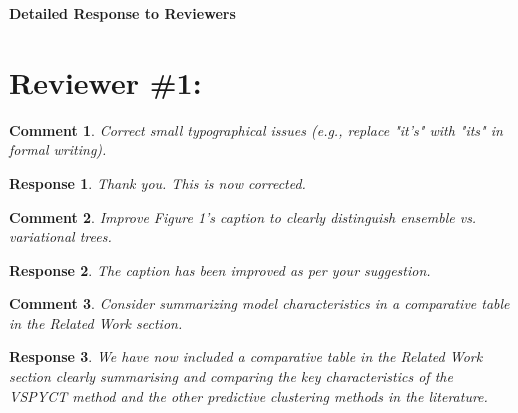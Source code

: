\documentclass [a4paper,11pt]{article}
\theoremstyle{blue}
\newtheorem{question}{Comment}[section]
\theoremstyle{blue}
\theoremstyle{note}
\newtheorem{answer}{Response}[section]
\theoremstyle{note}
\begin{document}
	
	\textbf{Detailed Response to Reviewers}\\[10pt]
	
	
	
	\section{Reviewer \#1:}


\begin{question}
Correct small typographical issues (e.g., replace "it's" with "its" in formal writing).
\end{question}

\begin{answer}

Thank you. This is now corrected.

\end{answer}


\begin{question}

Improve Figure 1's caption to clearly distinguish ensemble vs. variational trees.

\end{question}

\begin{answer}

The caption has been improved as per your suggestion.

\end{answer}

\begin{question}

Consider summarizing model characteristics in a comparative table in the Related Work section.

\end{question}

\begin{answer}

We have now included a comparative table in the Related Work section clearly summarising and comparing the key characteristics of the VSPYCT method and the other predictive clustering methods in the literature.

\end{answer}
\end{document}
